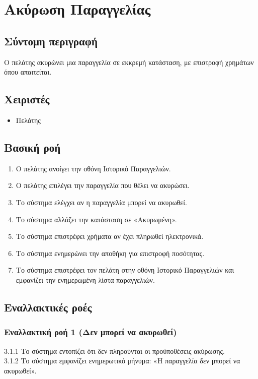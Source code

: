 \documentclass[12pt,a4paper,twoside]{book}
\begin{document}
\section{Ακύρωση Παραγγελίας}

\subsection{Σύντομη περιγραφή}
Ο πελάτης ακυρώνει μια παραγγελία σε εκκρεμή κατάσταση, με επιστροφή χρημάτων όπου απαιτείται.

\subsection{Χειριστές}
\begin{itemize}
    \item Πελάτης
\end{itemize}

\subsection{Βασική ροή}
\begin{enumerate}
    \item Ο πελάτης ανοίγει την οθόνη Ιστορικό Παραγγελιών. 
    \item Ο πελάτης επιλέγει την παραγγελία που θέλει να ακυρώσει. 
    \item Το σύστημα ελέγχει αν η παραγγελία μπορεί να ακυρωθεί. 
    \item Το σύστημα αλλάζει την κατάσταση σε «Ακυρωμένη».
    \item Το σύστημα επιστρέφει χρήματα αν έχει πληρωθεί ηλεκτρονικά. 
    \item Το σύστημα ενημερώνει την αποθήκη για επιστροφή ποσότητας. 
    \item Το σύστημα επιστρέφει τον πελάτη στην οθόνη Ιστορικό Παραγγελιών και εμφανίζει την ενημερωμένη λίστα παραγγελιών. 
\end{enumerate}

\subsection{Εναλλακτικές ροές}

\subsubsection*{Εναλλακτική ροή 1 (Δεν μπορεί να ακυρωθεί)}
3.1.1 Το σύστημα εντοπίζει ότι δεν πληρούνται οι προϋποθέσεις ακύρωσης.\\
\hspace*{\parindent}3.1.2 Το σύστημα εμφανίζει ενημερωτικό μήνυμα: «Η παραγγελία δεν μπορεί να ακυρωθεί».
\end{document}
